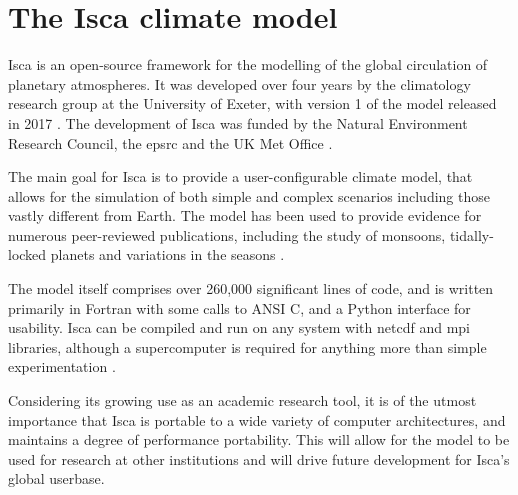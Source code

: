 \documentclass[a4paper,11pt]{report}
\begin{document}
\section{The Isca climate model}
Isca is an open-source framework for the modelling of the global circulation of planetary atmospheres. It was developed over four years by the climatology research group at the University of Exeter, with version 1 of the model released in 2017 \cite{vallis2018isca}. The development of Isca was funded by the Natural Environment Research Council, the \gls{epsrc} and the UK Met Office \cite{vallis2018isca}.
\par
The main goal for Isca is to provide a user-configurable climate model, that allows for the simulation of both simple and complex scenarios including those vastly different from Earth. The model has been used to provide evidence for numerous peer-reviewed publications, including the study of monsoons, tidally-locked planets and variations in the seasons  \cite{penn2017thermal, thomson2018atmospheric, geen2018regime}.
 \par
 The model itself comprises over 260,000 significant lines of code, and is written primarily in Fortran with some calls to ANSI C, and a Python interface for usability. Isca can be compiled and run on any system with \gls{netcdf} and \gls{mpi} libraries, although a supercomputer is required for anything more than simple experimentation \cite{vallis2018isca}. 
 \par
Considering its growing use as an academic research tool, it is of the utmost importance that Isca is portable to a wide variety of computer architectures, and maintains a degree of performance portability. This will allow for the model to be used for research at other institutions and will drive future development for Isca's global userbase.
\end{document}
